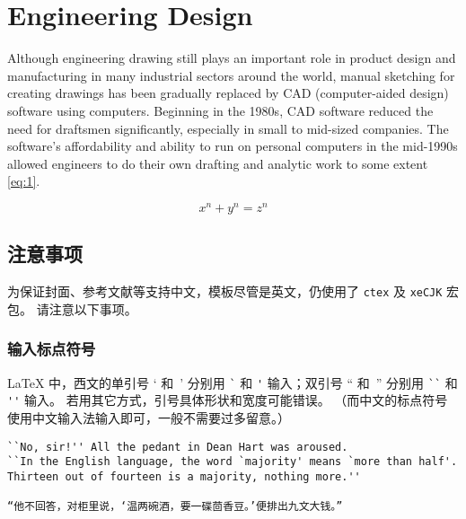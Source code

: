 
\chapter{Engineering Design}

Although engineering drawing still plays an important role in product design and manufacturing in many industrial sectors around the world, manual sketching for creating drawings has been gradually replaced by CAD (computer-aided design) software using computers. Beginning in the 1980s, CAD software reduced the need for draftsmen significantly, especially in small to mid-sized companies. The software's affordability and ability to run on personal computers in the mid-1990s allowed engineers to do their own drafting and analytic work to some extent \ref{eq:1}.

\begin{equation}
x^n + y^n = z^n
\label{eq:1}
\end{equation}

\section{注意事项}

为保证封面、参考文献等支持中文，模板尽管是英文，仍使用了 \texttt{ctex} 及 \texttt{xeCJK} 宏包。
请注意以下事项。

\subsection{输入标点符号}


\LaTeX{} 中，西文的单引号 ` 和\ ' 分别用 \verb|`| 和 \verb|'| 输入；双引号 `` 和\ '' 分别用 \verb|``| 和 \verb|''| 输入。
若用其它方式，引号具体形状和宽度可能错误。
（而中文的标点符号使用中文输入法输入即可，一般不需要过多留意。）

\begin{lstlisting}
``No, sir!'' All the pedant in Dean Hart was aroused.
``In the English language, the word `majority' means `more than half'.
Thirteen out of fourteen is a majority, nothing more.''

“他不回答，对柜里说，‘温两碗酒，要一碟茴香豆。’便排出九文大钱。”
\end{lstlisting}

